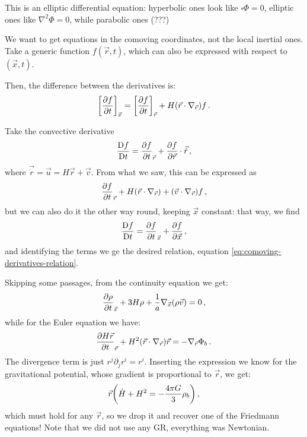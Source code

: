 \documentclass[main.tex]{subfiles}
\begin{document}
This is an elliptic differential equation: hyperbolic ones look like \( \square \Phi = 0\), elliptic ones like \(\nabla^2 \Phi =0  \), while parabolic ones (???)

We want to get equations in the comoving coordinates, not the local inertial ones. Take a generic function \(f(\vec{r}, t)\), which can also be expressed with respect to \((\vec{x}, t)\). 

Then, the difference between the derivatives is: 
%
\begin{align} \label{eq:comoving-derivatives-relation}
  \qty[\pdv{f}{t}]_{\vec{x}} =   \qty[\pdv{f}{t}]_{\vec{r}} + H \qty(\vec{r} \cdot \nabla_{\vec{r}}) f
\,.
\end{align}

Take the convective derivative 
%
\begin{align}
  \frac{\mathrm{D} f}{\mathrm{D}t } 
  = \pdv{f}{t}_{\vec{r}} + \pdv{f}{\vec{r}} \cdot \vec{\dot{r}} 
\,,
\end{align}
%
where \(\vec{\dot{r}
} = \vec{u} = H \vec{r} + \vec{v} \). 
From what we saw, this can be expressed as 
%
\begin{align}
  \pdv{f}{t}_{\vec{r}} + H \qty(\vec{r} \cdot \nabla_{\vec{r}}  ) + \qty(\vec{v} \cdot \nabla_{\vec{r}}) f 
\,,
\end{align}
%
but we can also do it the other way round, keeping \(\vec{x}\) constant: that way, we find 
%
\begin{align}
  \frac{\mathrm{D} f}{\mathrm{D}t } 
  = \pdv{f}{t}_{\vec{x}} + \pdv{f}{\vec{x}}
\,,
\end{align}
%
and identifying the terms we ge the desired relation, equation \eqref{eq:comoving-derivatives-relation}. 

Skipping some passages, from the continuity equation we get:
%
\begin{align}
  \pdv{\rho }{t}_{\vec{x}} + 3 H \rho + 
  \frac{1}{a} \nabla_{\vec{x}} \qty(\rho \vec{v}) = 0
\,,
\end{align}
%
while for the Euler equation we have: 
%
\begin{align}
  \pdv{H \vec{r}}{t}_{\vec{r}} + H^2 \qty(\vec{r} \cdot \nabla_{\vec{r}}) \vec{r} = - \nabla_{\vec{r}} \Phi_{b}
\,. 
\end{align}
%
The divergence term is just \(r^{j} \partial_{j} r^{i} = r^{i}\). Inserting the expression we know for the gravitational potential, whose gradient is proportional to \(\vec{r}\), we get: 
%
\begin{align}
  \vec{r} \qty(\dot{H} +  H^2 = - \frac{4 \pi G }{3} \rho_{b } )
\,,
\end{align}
%
which must hold for any \(\vec{r}\), so we drop it and recover one of the Friedmann equations! 
Note that we did not use any GR, everything was Newtonian. 
\end{document}
